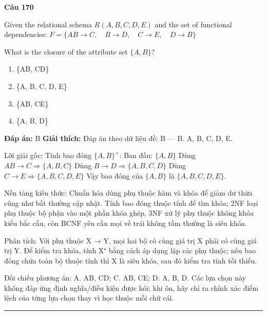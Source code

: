 \documentclass[11pt,a4paper]{article}
\newenvironment{question}[1]{%
  \par\vspace{1em}\noindent\textbf{\large Câu #1}\par\vspace{0.4em}
}{%
  \par\vspace{1em}\hrule\vspace{0.6em}
}
\newenvironment{choices}{%
  \begin{enumerate}[label=\textbf{\Alph*.},leftmargin=2.2em,itemsep=2pt,topsep=3pt]
}{%
  \end{enumerate}
}
\newcommand{\choice}{\item}
\begin{document}
\begin{question}{170}
Given the relational schema \(R(A, B, C, D, E)\) and the set of functional dependencies:
\(F = \{ AB \rightarrow C, \quad B \rightarrow D, \quad C \rightarrow E, \quad D \rightarrow B \}\)

What is the closure of the attribute set \(\{A, B\}\)?
\begin{choices}
\choice \{AB, CD\}
\choice \{A, B, C, D, E\}
\choice \{AB, CE\}
\choice \{A, B, D\}
\end{choices}
\textbf{Đáp án:} B
\textbf{Giải thích:} Đáp án theo dữ liệu đề: B — B. {A, B, C, D, E}.

Lời giải gốc: Tính bao đóng $\{A, B\}^+$: Ban đầu: $\{A, B\}$ Dùng $AB \rightarrow C \Rightarrow \{A, B, C\}$ Dùng $B \rightarrow D \Rightarrow \{A, B, C, D\}$ Dùng $C \rightarrow E \Rightarrow \{A, B, C, D, E\}$ Vậy bao đóng của $\{A, B\}$ là $\{A, B, C, D, E\}$.

Nền tảng kiến thức: Chuẩn hóa dùng phụ thuộc hàm và khóa để giảm dư thừa cũng như bất thường cập nhật. Tính bao đóng thuộc tính để tìm khóa; 2NF loại phụ thuộc bộ phận vào một phần khóa ghép, 3NF xử lý phụ thuộc không khóa kiểu bắc cầu, còn BCNF yêu cầu mọi vế trái không tầm thường là siêu khóa.

Phân tích: Với phụ thuộc X → Y, mọi hai bộ có cùng giá trị X phải có cùng giá trị Y. Để kiểm tra khóa, tính X⁺ bằng cách áp dụng lặp các phụ thuộc; nếu bao đóng chứa toàn bộ thuộc tính thì X là siêu khóa, sau đó kiểm tra tính tối thiểu.

Đối chiếu phương án: A. {AB, CD}; C. {AB, CE}; D. {A, B, D}. Các lựa chọn này không đáp ứng định nghĩa/điều kiện được hỏi; khi ôn, hãy chỉ ra chính xác điểm lệch của từng lựa chọn thay vì học thuộc mỗi chữ cái.
\end{question}
\end{document}

